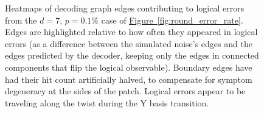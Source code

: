 \documentclass[onecolumn,unpublished,a4paper]{quantumarticle}
\theoremstyle{definition}
\theoremstyle{definition}
\theoremstyle{definition}
\newcommand{\fig}[1]{\hyperref[fig:#1]{Figure~\ref*{fig:#1}}}
\begin{document}
\begin{figure}
    \centering
    \caption{
        Heatmaps of decoding graph edges contributing to logical errors from the $d=7$, $p=0.1\%$ case of \fig{round_error_rate}.
        Edges are highlighted relative to how often they appeared in logical errors (as a difference between the simulated noise's edges and the edges predicted by the decoder, keeping only the edges in connected components that flip the logical observable).
        Boundary edges have had their hit count artificially halved, to compensate for symptom degeneracy at the sides of the patch.
        Logical errors appear to be traveling along the twist during the Y basis transition.
    }
    \label{fig:error_heat}
\end{figure}
\end{document}
